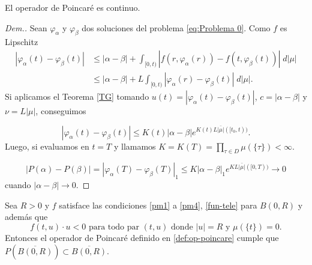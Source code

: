  
 \begin{lem}
    El operador de Poincaré es continuo.\label{opr continuo}
\end{lem}
\begin{proof}[Dem.]
 Sean $\varphi_\alpha$ y $\varphi_\beta$ dos soluciones del problema \eqref{eq:Problema 0}. Como $f$ es Lipschitz 
 \begin{equation*}
 \begin{split}
 	| \varphi_\alpha(t)-\varphi_\beta(t)|&\leq |\alpha-\beta |+\int_{[0,t)} |f(r,\varphi_\alpha(r)) -f(t,\varphi_\beta(t))| \; d|\mu|\\
	&\leq |\alpha-\beta|+L\int_{[0,t)} |\varphi_\alpha(r) -\varphi_\beta(t)| \; d|\mu|.
 \end{split}
\end{equation*}
 Si aplicamos el Teorema \ref{TG} tomando $u(t)=|\varphi_\alpha(t)-\varphi_\beta(t)|$, $c=|\alpha-\beta|$ y  $\nu=L|\mu|$, conseguimos

\begin{equation*}
|\varphi_\alpha(t)-\varphi_\beta(t)|\leq K(t) |\alpha-\beta|e^{K(t)L\bar{|\mu|}([t_0,t))}.
\end{equation*}
Luego, si evaluamos en $t=T$ y llamamos  $K=K(T)=\displaystyle\prod_{\tau\in D}\mu(\{\tau\})<\infty$.
 

\begin{equation*}
 		|P(\alpha)-P(\beta)|=|\varphi_{\alpha}(T)-\varphi_{\beta}(T)|_{1}\leq K |\alpha-\beta|_{1}e^{KL\bar{|\mu|}([0,T))}\to 0
 	\end{equation*}
 cuando $|\alpha-\beta|\to 0$.
\end{proof}
 
 
 

 
 

 \begin{thm} \label{th: P}
 	Sea $R>0$ y $f$ satisface las condiciones \ref{pm1} a \ref{pm4}, \ref{fun-tele} para $B(0,R)$  y  además que
 	\begin{equation}
 		f(t,u)\cdot u<0 \text{ para todo par } (t,u) \text{ donde }  |u| =R  \text{ y   } \mu(\{t\})=0.  \label{eq:4}
 	\end{equation}
 Entonces el operador de Poincaré definido en \ref{def:op-poincare} cumple que \\
 $P\left(  \overline{B(0,R)}\right)  \subset \overline{B(0,R)}$.
 \end{thm}
 
